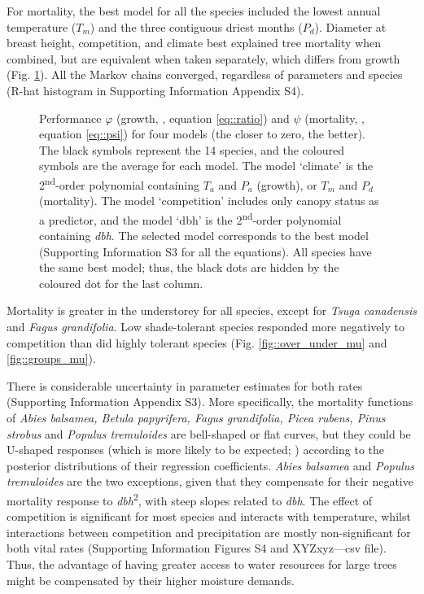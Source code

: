 For mortality, the best model for all the species included the lowest annual temperature ($ T_m $) and the three contiguous driest months ($ P_d $). Diameter at breast height, competition, and climate best explained tree mortality when combined, but are equivalent when taken separately, which differs from growth (Fig. \ref{fig::aic_waic}). All the Markov chains converged, regardless of parameters and species (R-hat histogram in Supporting Information Appendix S4). 
\begin{figure}
	\centering
	
	\caption{Performance $ \varphi $ (growth, \CircSteel, equation \ref{eq::ratio}) and $ \psi $ (mortality, \MoveUp, equation \ref{eq::psi}) for four models (the closer to zero, the better). The black symbols represent the 14 species, and the coloured symbols are the average for each model. The model `climate' is the 2\textsuperscript{nd}-order polynomial containing $ T_a $ and $ P_a $ (growth), or $ T_m $ and $ P_d $ (mortality). The model `competition' includes only canopy status as a predictor, and the model `dbh' is the 2\textsuperscript{nd}-order polynomial containing \textit{dbh}. The selected model corresponds to the best model (Supporting Information S3 for all the equations). All species have the same best model; thus, the black dots are hidden by the coloured dot for the last column. \label{fig::aic_waic}}
\end{figure}
Mortality is greater in the understorey for all species, except for \textit{Tsuga canadensis} and \textit{Fagus grandifolia}. Low shade-tolerant species responded more negatively to competition than did highly tolerant species (Fig. \ref{fig::over_under_mu} and \ref{fig::groups_mu}).

There is considerable uncertainty in parameter estimates for both rates (Supporting Information Appendix S3). More specifically, the mortality functions of \textit{Abies balsamea, Betula papyrifera, Fagus grandifolia, Picea rubens, Pinus strobus} and \textit{Populus tremuloides} are bell-shaped or flat curves, but they could be U-shaped responses (which is more likely to be expected; \citet{Lines2010}) according to the posterior distributions of their regression coefficients. \textit{Abies balsamea} and \textit{Populus tremuloides} are the two exceptions, given that they compensate for their negative mortality response to \textit{dbh}\textsuperscript{2}, with steep slopes related to \textit{dbh}. The effect of competition is significant for most species and interacts with temperature, whilst interactions between competition and precipitation are mostly non-significant for both vital rates (Supporting Information Figures S4 and XYZxyz---csv file). Thus, the advantage of having greater access to water resources for large trees might be compensated by their higher moisture demands.

